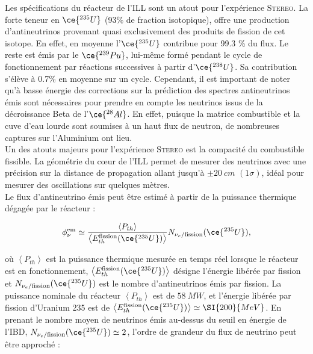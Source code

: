 Les spécifications du réacteur de l'ILL sont un atout pour l'expérience \textsc{Stereo}. La forte teneur en $\ce{^{235}U}$ (93\% de fraction isotopique), offre une production d'antineutrinos provenant quasi exclusivement des produits de fission de cet isotope. En effet, en moyenne l'$\ce{^{235}U}$ contribue pour 99.3 \% du flux. Le reste est émis par le $\ce{^{239}Pu}$, lui-même formé pendant le cycle de fonctionnement par réactions successives à partir d'$\ce{^{238}U}$. Sa contribution s'élève à 0.7\% en moyenne sur un cycle. Cependant, il est important de noter qu'à basse énergie des corrections sur la prédiction des spectres antineutrinos émis sont nécessaires pour prendre en compte les neutrinos issus de la décroissance Beta de l'$\ce{^{28}Al}$. En effet, puisque la matrice combustible et la cuve d'eau lourde sont soumises à un haut flux de neutron, de nombreuses captures sur l'Aluminium ont lieu.\\ 

Un des atouts majeurs pour l'expérience \textsc{Stereo} est la compacité du combustible fissible. La géométrie du c\oe ur de l'ILL permet de mesurer des neutrinos avec une précision sur la distance de propagation allant jusqu'à $\pm \SI{20}{cm}$ $(1 \sigma)$, idéal pour mesurer des oscillations sur quelques mètres.\\ 

Le flux d'antineutrino émis peut être estimé à partir de la puissance thermique dégagée par le réacteur : 

\begin{equation} 
\label{eq:phi_nu_em} 
\phi_\nu^\textrm{em} \simeq \frac{\left<P_{th}\right>}{\left<E_{th}^{\textrm{fission}} (\ce{^{235}U})\right>} N_{\nu_e / \textrm{fission}}(\ce{^{235}U}), 
\end{equation} 

\bigbreak 

où $\left<P_{th}\right>$ est la puissance thermique mesurée en temps réel lorsque le réacteur est en fonctionnement, $\left<E_{th}^{\textrm{fission}} (\ce{^{235}U})\right>$ désigne l'énergie libérée par fission et $N_{\nu_e / \textrm{fission}}(\ce{^{235}U})$ est le nombre d'antineutrinos émis par fission. La puissance nominale du réacteur $\left<P_{th}\right>$ est de $\SI{58}{MW}$, et l'énergie libérée par fission d'Uranium 235 est de $\left<E_{th}^{\textrm{fission}} (\ce{^{235}U})\right> \simeq \SI{200}{MeV}$. En prenant le nombre moyen de neutrinos émis au-dessus du seuil en énergie de l'IBD, $N_{\nu_e / \textrm{fission}}(\ce{^{235}U}) \simeq 2$, l'ordre de grandeur du flux de neutrino peut être approché : 

